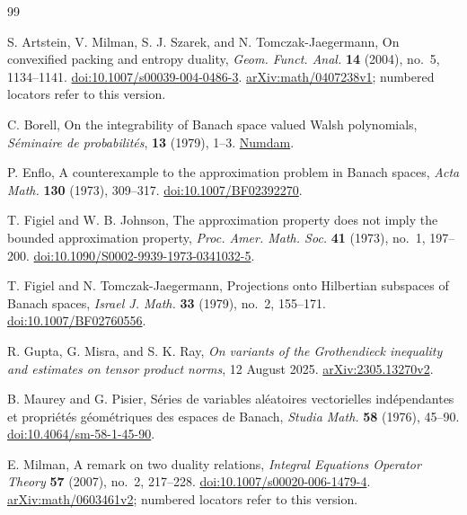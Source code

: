 \begingroup
\small
\raggedright
\begin{thebibliography}{99}

S. Artstein, V. Milman, S. J. Szarek, and N. Tomczak-Jaegermann,
On convexified packing and entropy duality,
\emph{Geom. Funct. Anal.} \textbf{14} (2004), no.~5, 1134--1141.
\href{https://doi.org/10.1007/s00039-004-0486-3}
{doi:10.1007/s00039-004-0486-3}.
\href{https://arxiv.org/abs/math/0407238v1}{arXiv:math/0407238v1};
numbered locators refer to this version.

C. Borell,
On the integrability of Banach space valued Walsh polynomials,
\emph{S\'eminaire de probabilit\'es}, \textbf{13} (1979), 1--3.
\href{https://www.numdam.org/item/SPS_1979__13__1_0/}{Numdam}.

P. Enflo,
A counterexample to the approximation problem in Banach spaces,
\emph{Acta Math.} \textbf{130} (1973), 309--317.
\href{https://doi.org/10.1007/BF02392270}{doi:10.1007/BF02392270}.

T. Figiel and W. B. Johnson,
The approximation property does not imply the bounded approximation property,
\emph{Proc. Amer. Math. Soc.} \textbf{41} (1973), no.~1, 197--200.
\href{https://doi.org/10.1090/S0002-9939-1973-0341032-5}
{doi:10.1090/S0002-9939-1973-0341032-5}.

T. Figiel and N. Tomczak-Jaegermann,
Projections onto Hilbertian subspaces of Banach spaces,
\emph{Israel J. Math.} \textbf{33} (1979), no.~2, 155--171.
\href{https://doi.org/10.1007/BF02760556}{doi:10.1007/BF02760556}.

R. Gupta, G. Misra, and S. K. Ray,
\emph{On variants of the Grothendieck inequality and estimates on
tensor product norms},
12 August 2025.
\href{https://arxiv.org/abs/2305.13270v2}{arXiv:2305.13270v2}.

B. Maurey and G. Pisier,
S\'eries de variables al\'eatoires vectorielles ind\'ependantes et
propri\'et\'es g\'eom\'etriques des espaces de Banach,
\emph{Studia Math.} \textbf{58} (1976), 45--90.
\href{https://doi.org/10.4064/sm-58-1-45-90}{doi:10.4064/sm-58-1-45-90}.

E. Milman,
A remark on two duality relations,
\emph{Integral Equations Operator Theory} \textbf{57} (2007),
no.~2, 217--228.
\href{https://doi.org/10.1007/s00020-006-1479-4}
{doi:10.1007/s00020-006-1479-4}.
\href{https://arxiv.org/abs/math/0603461v2}{arXiv:math/0603461v2};
numbered locators refer to this version.


\end{thebibliography}

